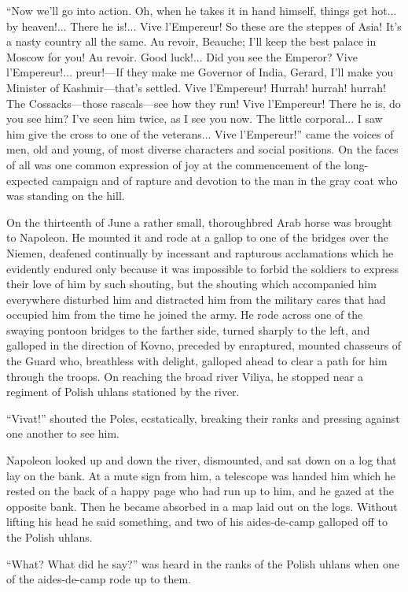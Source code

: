 ``Now we'll go into action. Oh, when he takes it in hand himself,
things get hot... by heaven!... There he is!... Vive l'Empereur!
So these are the steppes of Asia! It's a nasty country all the
same. Au revoir, Beauche; I'll keep the best palace in Moscow for
you! Au revoir. Good luck!... Did you see the Emperor? Vive
l'Empereur!... preur!---If they make me Governor of India,
Gerard, I'll make you Minister of Kashmir---that's settled. Vive
l'Empereur! Hurrah! hurrah! hurrah!  The Cossacks---those
rascals---see how they run! Vive l'Empereur!  There he is, do you
see him? I've seen him twice, as I see you now. The little
corporal... I saw him give the cross to one of the
veterans... Vive l'Empereur!'' came the voices of men, old and
young, of most diverse characters and social positions. On the
faces of all was one common expression of joy at the commencement
of the long-expected campaign and of rapture and devotion to the
man in the gray coat who was standing on the hill.

On the thirteenth of June a rather small, thoroughbred Arab horse
was brought to Napoleon. He mounted it and rode at a gallop to
one of the bridges over the Niemen, deafened continually by
incessant and rapturous acclamations which he evidently endured
only because it was impossible to forbid the soldiers to express
their love of him by such shouting, but the shouting which
accompanied him everywhere disturbed him and distracted him from
the military cares that had occupied him from the time he joined
the army. He rode across one of the swaying pontoon bridges to
the farther side, turned sharply to the left, and galloped in the
direction of Kovno, preceded by enraptured, mounted chasseurs of
the Guard who, breathless with delight, galloped ahead to clear a
path for him through the troops. On reaching the broad river
Viliya, he stopped near a regiment of Polish uhlans stationed by
the river.

``Vivat!'' shouted the Poles, ecstatically, breaking their ranks
and pressing against one another to see him.

Napoleon looked up and down the river, dismounted, and sat down
on a log that lay on the bank. At a mute sign from him, a
telescope was handed him which he rested on the back of a happy
page who had run up to him, and he gazed at the opposite
bank. Then he became absorbed in a map laid out on the
logs. Without lifting his head he said something, and two of his
aides-de-camp galloped off to the Polish uhlans.

``What? What did he say?'' was heard in the ranks of the Polish
uhlans when one of the aides-de-camp rode up to them.

